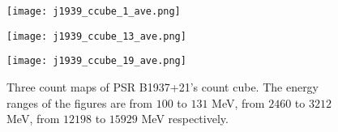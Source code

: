 \documentclass[a4paper, 12pt]{report}
\begin{document}
        \begin{figure}[!htp]
          \begin{minipage}{0.32\textwidth}
            \begin{center} 
              \texttt{[image: j1939\_ccube\_1\_ave.png]}
            \end{center}
          \end{minipage}
          \begin{minipage}{0.32\textwidth}
            \begin{center}
              \texttt{[image: j1939\_ccube\_13\_ave.png]}
            \end{center}
          \end{minipage}
          \begin{minipage}{0.32\textwidth}
            \begin{center}
            \texttt{[image: j1939\_ccube\_19\_ave.png]}
            \end{center}
          \end{minipage}
          \caption[Three count maps of PSR B1937+21's count cube.]
            {Three count maps of PSR B1937+21's count cube. The energy ranges of the 
            figures are from $100$ to $131$ MeV, from $2460$ to $3212$ MeV, from $12198$ to
            $15929$ MeV respectively.}
          \label{fig: j1939_count_cube_ave}
        \end{figure}
\end{document}
